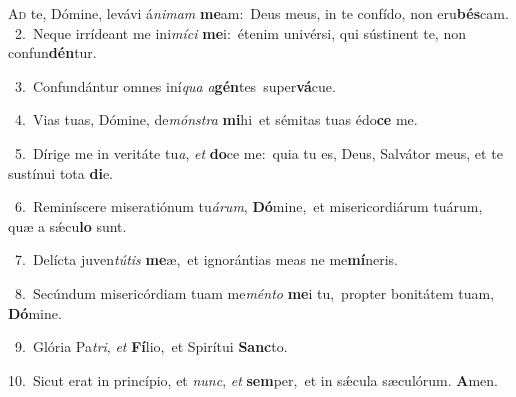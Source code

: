 \lettrine{\initial\textcolor{\initialcolor}{A}}{d} te, Dómine, levávi á\-\textit{ni}\-\textit{mam} \textbf{me}\-am:~\star Deus meus, in te confído, non eru\-\textbf{bés}\-cam.\\
{\numbfont\textcolor{\numbcolor}{~2.}}~Neque irrídeant me ini\-\textit{mí}\-\textit{ci} \textbf{me}\-i:~\star étenim univérsi, qui sústinent te, non confun\-\textbf{dén}\-tur.\par
{\numbfont\textcolor{\numbcolor}{~3.}}~Confundántur omnes iní\textit{qua} \textit{a}\-\textbf{gén}tes~\star super\-\textbf{vá}\-cue.\par
{\numbfont\textcolor{\numbcolor}{~4.}}~Vias tuas, Dómine, de\-\textit{móns}\-\textit{tra} \textbf{mi}\-hi~\star et sémitas tuas édo\textbf{ce} me.\par
{\numbfont\textcolor{\numbcolor}{~5.}}~Dírige me in veritáte tu\-\textit{a}\-, \textit{et} \textbf{do}\-ce me:~\star quia tu es, Deus, Salvátor meus, et te sustínui tota \textbf{di}\-e.\par
{\numbfont\textcolor{\numbcolor}{~6.}}~Reminíscere miseratiónum tu\-\textit{á}\-\textit{rum}, \textbf{Dó}\-mine,~\star et misericordiárum tuárum, quæ a sǽcu\textbf{lo} sunt.\par
{\numbfont\textcolor{\numbcolor}{~7.}}~Delícta juven\-\textit{tú}\-\textit{tis} \textbf{me}\-æ,~\star et ignorántias meas ne me\-\textbf{mí}\-neris.\par
{\numbfont\textcolor{\numbcolor}{~8.}}~Secúndum misericórdiam tuam me\-\textit{mén}\-\textit{to} \textbf{me}\-i tu,~\star propter bonitátem tuam, \textbf{Dó}\-mine.\par
{\numbfont\textcolor{\numbcolor}{~9.}}~Glória Pa\-\textit{tri}\-, \textit{et} \textbf{Fí}\-lio,~\star et Spirítui \textbf{Sanc}\-to.\par
{\numbfont\textcolor{\numbcolor}{10.}}~Sicut erat in princípio, et \textit{nunc}\-, \textit{et} \textbf{sem}\-per,~\star et in sǽcula sæculórum. \textbf{A}\-men.\par
